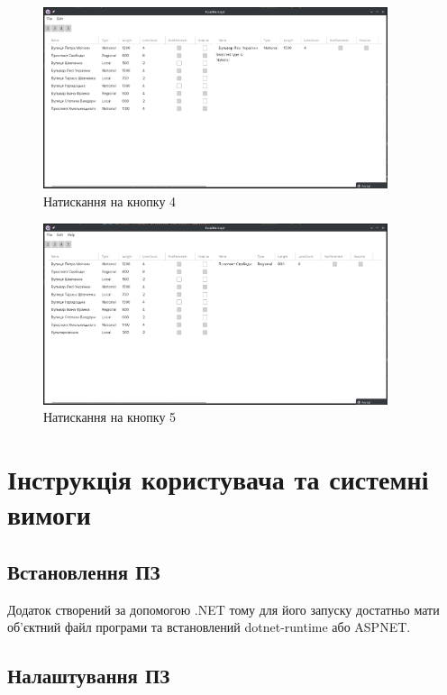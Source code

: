 \documentclass[14pt]{extarticle}
\begin{document}
\begin{figure}[H]
    \centering
    \includegraphics[width=0.90\textwidth]{task4.png}
    \caption{Натискання на кнопку 4}
\end{figure}
\begin{figure}[H]
    \centering
    \includegraphics[width=0.90\textwidth]{task5.png}
    \caption{Натискання на кнопку 5}
\end{figure}

\section{Інструкція користувача та системні вимоги}

\subsection{Встановлення ПЗ}

Додаток створений за допомогою .NET тому для його запуску достатньо мати об'єктний файл програми
та встановлений dotnet-runtime або ASPNET.

\subsection{Налаштування ПЗ}
\end{document}
